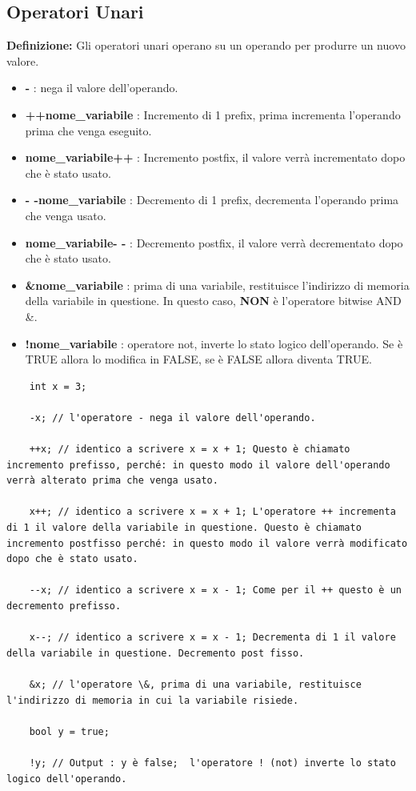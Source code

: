 \subsection{Operatori Unari}

\textsf{\small \textbf{Definizione: } Gli operatori unari operano su un operando per produrre un nuovo valore.} \\

\begin{itemize}
	\item \textsf{\small \textbf{-} : nega il valore dell'operando.}
	\item \textsf{\small \textbf{++nome\_variabile} : Incremento di 1 prefix, prima incrementa l'operando prima che venga eseguito.}
	\item \textsf{\small \textbf{nome\_variabile++} : Incremento postfix, il valore verrà incrementato dopo che è stato usato.}
	\item \textsf{\small \textbf{- -nome\_variabile} : Decremento di 1 prefix, decrementa l'operando prima che venga usato. }
	\item \textsf{\small \textbf{nome\_variabile- -} : Decremento postfix, il valore verrà decrementato dopo che è stato usato.}
	\item \textsf{\small \textbf{\&nome\_variabile} : prima di una variabile, restituisce l'indirizzo di memoria della variabile in questione. In questo caso, \textbf{NON} è l'operatore bitwise AND \&.}
	\item \textsf{\small \textbf{!nome\_variabile} : operatore not, inverte lo stato logico dell'operando. Se è TRUE allora lo modifica in FALSE, se è FALSE allora diventa TRUE.}
\end{itemize}

\begin{lstlisting}
	int x = 3;
	
	-x; // l'operatore - nega il valore dell'operando.
	
	++x; // identico a scrivere x = x + 1; Questo è chiamato incremento prefisso, perché: in questo modo il valore dell'operando verrà alterato prima che venga usato.
	
	x++; // identico a scrivere x = x + 1; L'operatore ++ incrementa di 1 il valore della variabile in questione. Questo è chiamato incremento postfisso perché: in questo modo il valore verrà modificato dopo che è stato usato.
	
	--x; // identico a scrivere x = x - 1; Come per il ++ questo è un decremento prefisso.
	
	x--; // identico a scrivere x = x - 1; Decrementa di 1 il valore della variabile in questione. Decremento post fisso.
	
	&x; // l'operatore \&, prima di una variabile, restituisce l'indirizzo di memoria in cui la variabile risiede.
	
	bool y = true;
	
	!y; // Output : y è false;  l'operatore ! (not) inverte lo stato logico dell'operando.
	
\end{lstlisting}

